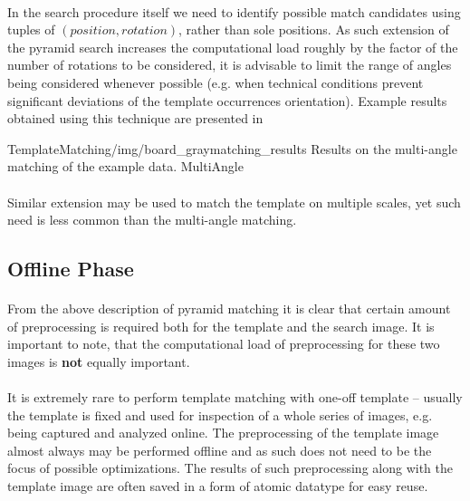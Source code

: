 \paragraph*{}
In the search procedure itself we need to identify possible match candidates using tuples of $(position, rotation)$, rather than sole positions. As such extension of the pyramid search increases the computational load roughly by the factor of the number of rotations to be considered, it is advisable to limit the range of angles being considered whenever possible (e.g. when technical conditions prevent significant deviations of the template occurrences orientation). Example results obtained using this technique are presented in 

\oneFigure
{TemplateMatching/img/board_graymatching_results}
{Results on the multi-angle matching of the example data.}
{MultiAngle}
{\basicWidth}

\paragraph*{}
Similar extension may be used to match the template on multiple scales, yet such need is less common than the multi-angle matching.

\subsection{Offline Phase}

\paragraph*{}
From the above description of pyramid matching it is clear that certain amount of preprocessing is required both for the template and the search image. It is important to note, that the computational load of preprocessing for these two images is \textbf{not} equally important.

\paragraph*{}
It is extremely rare to perform template matching with one-off template -- usually the template is fixed and used for inspection of a whole series of images, e.g. being captured and analyzed online. The preprocessing of the template image almost always may be performed offline and as such does not need to be the focus of possible optimizations. The results of such preprocessing along with the template image are often saved in a form of atomic datatype for easy reuse.

